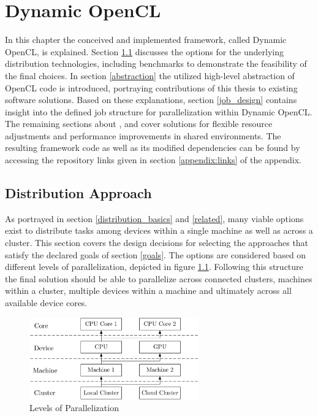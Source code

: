 \chapter{Dynamic OpenCL}
\label{main}
In this chapter the conceived and implemented framework, called Dynamic OpenCL, is explained. Section \ref{distribution} discusses the options for the underlying distribution technologies, including benchmarks to demonstrate the feasibility of the final choices. In section \ref{abstraction} the utilized high-level abstraction of OpenCL code is introduced, portraying contributions of this thesis to existing software solutions. Based on these explanations, section \ref{job_design} contains insight into the defined job structure for parallelization within Dynamic OpenCL. The remaining sections about \textit{}, \textit{} and \textit{} cover solutions for flexible resource adjustments and performance improvements in shared environments. The resulting framework code as well as its modified dependencies can be found by accessing the repository links given in section \ref{appendix:links} of the appendix.

\section{Distribution Approach}
\label{distribution}
As portrayed in section \ref{distribution_basics} and \ref{related}, many viable options exist to distribute tasks among devices within a single machine as well as across a cluster. This section covers the design decisions for selecting the approaches that satisfy the declared goals of section \ref{goals}. The options are considered based on different levels of parallelization, depicted in figure \ref{img:parallelization_levels}. Following this structure the final solution should be able to parallelize across connected clusters, machines within a cluster, multiple devices within a machine and ultimately across all available device cores.

\begin{figure}[H]
	\includegraphics[width=0.65\textwidth]{drawings/parallelization_struct.pdf}
	\centering
	\caption{Levels of Parallelization}
	\label{img:parallelization_levels}
\end{figure}

